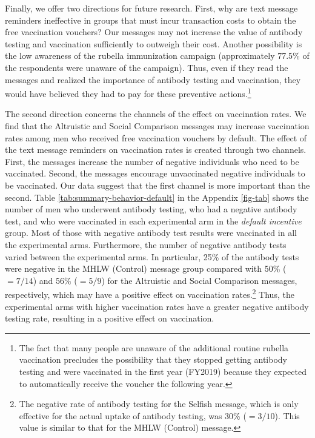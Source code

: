 \documentclass[
]{article}
\begin{document}
Finally, we offer two directions for future research. First, why are text message reminders ineffective in groups that must incur transaction costs to obtain the free vaccination vouchers? Our messages may not increase the value of antibody testing and vaccination sufficiently to outweigh their cost. Another possibility is the low awareness of the rubella immunization campaign (approximately 77.5\% of the respondents were unaware of the campaign). Thus, even if they read the messages and realized the importance of antibody testing and vaccination, they would have believed they had to pay for these preventive actions.\footnote{The fact that many people are unaware of the additional routine rubella vaccination precludes the possibility that they stopped getting antibody testing and were vaccinated in the first year (FY2019) because they expected to automatically receive the voucher the following year.}

The second direction concerns the channels of the effect on vaccination rates. We find that the Altruistic and Social Comparison messages may increase vaccination rates among men who received free vaccination vouchers by default. The effect of the text message reminders on vaccination rates is created through two channels. First, the messages increase the number of negative individuals who need to be vaccinated. Second, the messages encourage unvaccinated negative individuals to be vaccinated. Our data suggest that the first channel is more important than the second. Table \ref{tab:summary-behavior-default} in the Appendix \ref{fig-tab} shows the number of men who underwent antibody testing, who had a negative antibody test, and who were vaccinated in each experimental arm in the \emph{default incentive} group. Most of those with negative antibody test results were vaccinated in all the experimental arms. Furthermore, the number of negative antibody tests varied between the experimental arms. In particular, 25\% of the antibody tests were negative in the MHLW (Control) message group compared with 50\% (\(=7/14\)) and 56\% (\(=5/9\)) for the Altruistic and Social Comparison messages, respectively, which may have a positive effect on vaccination rates.\footnote{The negative rate of antibody testing for the Selfish message, which is only effective for the actual uptake of antibody testing, was 30\% (\(=3/10\)). This value is similar to that for the MHLW (Control) message.} Thus, the experimental arms with higher vaccination rates have a greater negative antibody testing rate, resulting in a positive effect on vaccination.
\end{document}
